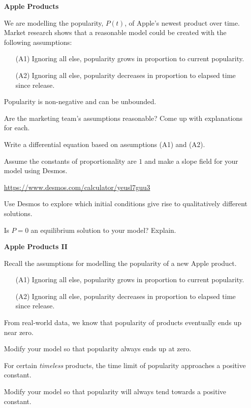 \documentclass{workbook}
\begin{document}
\begin{slide}
	{\bfseries Apple Products}

	\question
	We are modelling the popularity, $P(t)$, of Apple's newest product over time. Market research shows that a reasonable model could be created with
	the following assumptions:
	\begin{itemize}
		\item[(A1)] Ignoring all else, popularity grows in proportion
		to current popularity.
		\item[(A2)] Ignoring all else, popularity decreases in proportion to
		elapsed time since release.
	\end{itemize}

	Popularity is non-negative and can be unbounded.

	\begin{parts}  
		\item Are the marketing team's assumptions reasonable? Come up with 
		explanations for each.
		\item Write a differential equation based on assumptions (A1) and (A2).

		\item Assume the constants of proportionality are $1$ and make a
		slope field for your model using Desmos.

		{\small \url{https://www.desmos.com/calculator/yeusl7guu3}}

		\item Use Desmos to explore which initial conditions give rise to
		qualitatively different solutions.

		\item Is $P=0$ an equilibrium solution to your model? Explain.

	\end{parts}
\end{slide}

\begin{slide}
	{\bfseries Apple Products II}

	\question
	Recall the assumptions for modelling the popularity of a new Apple product.
	\begin{itemize}
		\item[(A1)] Ignoring all else, popularity grows in proportion
		to current popularity.
		\item[(A2)] Ignoring all else, popularity decreases in proportion to
		elapsed time since release.
	\end{itemize}

	\begin{parts}  
		\item From real-world data, we know that popularity of products
		eventually ends up near zero.

		Modify your model so that popularity always ends up at zero.

		\item For certain \emph{timeless} products, the time limit
		of popularity approaches a
		positive constant.

		Modify your model so that popularity will always tend towards a
		positive constant.

	\end{parts}
\end{slide}
\end{document}
